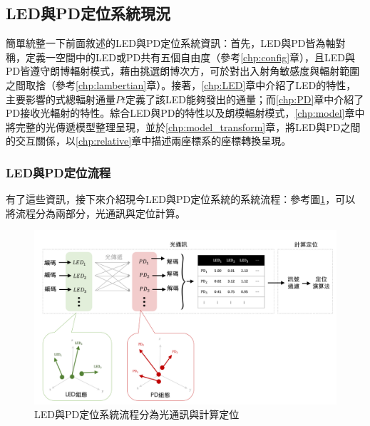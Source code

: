         






    \subsection{LED與PD定位系統現況}
    \label{chp:LEDPD_now}
        
        簡單統整一下前面敘述的LED與PD定位系統資訊：首先，LED與PD皆為軸對稱，定義一空間中的LED或PD共有五個自由度（參考\ref{chp:config}章），且LED與PD皆遵守朗博輻射模式，藉由挑選朗博次方，可於對出入射角敏感度與輻射範圍之間取捨（參考\ref{chp:lambertian}章）。接著，\ref{chp:LED}章中介紹了LED的特性，主要影響的式總輻射通量$Pt$定義了該LED能夠發出的通量；而\ref{chp:PD}章中介紹了PD接收光輻射的特性。綜合LED與PD的特性以及朗模輻射模式，\ref{chp:model}章中將完整的光傳遞模型整理呈現，並於\ref{chp:model_transform}章，將LED與PD之間的交互關係，以\ref{chp:relative}章中描述兩座標系的座標轉換呈現。



        

        \subsubsection{LED與PD定位流程}

        有了這些資訊，接下來介紹現今LED與PD定位系統的系統流程：參考圖\ref{pic:lp_system_structure}，可以將流程分為兩部分，光通訊與定位計算。

        \begin{figure}[ht]
            \centering
            \includegraphics[width=14cm]{ch2pic/lp_system_structure.png}
            \caption{LED與PD定位系統流程分為光通訊與計算定位}
            \label{pic:lp_system_structure}
        \end{figure}

